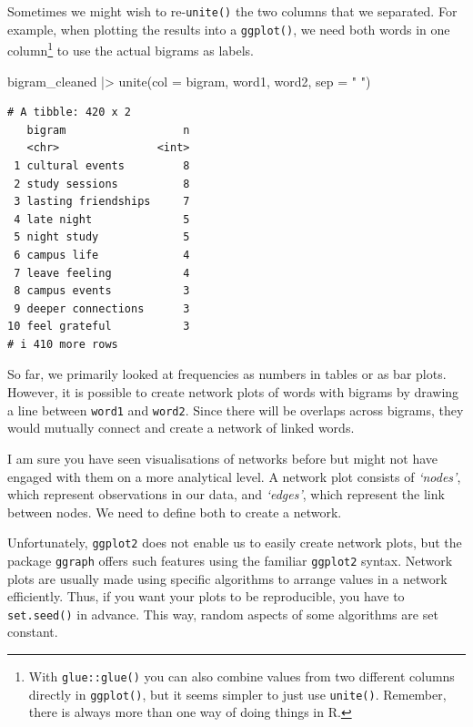 \documentclass[
  letterpaper,
]{krantz}
\makeatletter
\newenvironment{Shaded}{\begin{snugshade}}{\end{snugshade}}
\newcommand{\AttributeTok}[1]{\textcolor[rgb]{0.40,0.45,0.13}{#1}}
\newcommand{\FunctionTok}[1]{\textcolor[rgb]{0.28,0.35,0.67}{#1}}
\newcommand{\NormalTok}[1]{\textcolor[rgb]{0.00,0.23,0.31}{#1}}
\newcommand{\SpecialCharTok}[1]{\textcolor[rgb]{0.37,0.37,0.37}{#1}}
\newcommand{\StringTok}[1]{\textcolor[rgb]{0.13,0.47,0.30}{#1}}
\newenvironment{kframe}{%
\medskip{}
\setlength{\fboxsep}{.8em}
 \def\at@end@of@kframe{}%
 \ifinner\ifhmode%
  \def\at@end@of@kframe{\end{minipage}}%
  \begin{minipage}{\columnwidth}%
 \fi\fi%
 \def\FrameCommand##1{\hskip\@totalleftmargin \hskip-\fboxsep
 \colorbox{shadecolor}{##1}\hskip-\fboxsep
     \hskip-\linewidth \hskip-\@totalleftmargin \hskip\columnwidth}%
 \MakeFramed {\advance\hsize-\width
   \@totalleftmargin\z@ \linewidth\hsize
   \@setminipage}}%
 {\par\unskip\endMakeFramed%
 \at@end@of@kframe}
\renewenvironment{Shaded}{\begin{kframe}}{\end{kframe}}
\makeatother
\begin{document}
Sometimes we might wish to re-\texttt{unite()} the two columns that we
separated. For example, when plotting the results into a
\texttt{ggplot()}, we need both words in one column\footnote{With
  \texttt{glue::glue()} you can also combine values from two different
  columns directly in \texttt{ggplot()}, but it seems simpler to just
  use \texttt{unite()}. Remember, there is always more than one way of
  doing things in R.} to use the actual bigrams as labels.

\begin{Shaded}
\begin{Highlighting}[]
\NormalTok{bigram\_cleaned }\SpecialCharTok{|\textgreater{}}
  \FunctionTok{unite}\NormalTok{(}\AttributeTok{col =}\NormalTok{ bigram,}
\NormalTok{        word1, word2,}
        \AttributeTok{sep =} \StringTok{" "}\NormalTok{)}
\end{Highlighting}
\end{Shaded}

\begin{verbatim}
# A tibble: 420 x 2
   bigram                  n
   <chr>               <int>
 1 cultural events         8
 2 study sessions          8
 3 lasting friendships     7
 4 late night              5
 5 night study             5
 6 campus life             4
 7 leave feeling           4
 8 campus events           3
 9 deeper connections      3
10 feel grateful           3
# i 410 more rows
\end{verbatim}

So far, we primarily looked at frequencies as numbers in tables or as
bar plots. However, it is possible to create network plots of words with
bigrams by drawing a line between \texttt{word1} and \texttt{word2}.
Since there will be overlaps across bigrams, they would mutually connect
and create a network of linked words.

I am sure you have seen visualisations of networks before but might not
have engaged with them on a more analytical level. A network plot
consists of \emph{`nodes'}, which represent observations in our data,
and \emph{`edges'}, which represent the link between nodes. We need to
define both to create a network.

Unfortunately, \texttt{ggplot2} does not enable us to easily create
network plots, but the package \texttt{ggraph} offers such features
using the familiar \texttt{ggplot2} syntax. Network plots are usually
made using specific algorithms to arrange values in a network
efficiently. Thus, if you want your plots to be reproducible, you have
to \texttt{set.seed()} in advance. This way, random aspects of some
algorithms are set constant.
\end{document}
